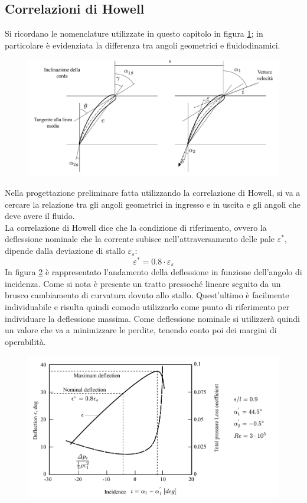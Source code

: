 \subsection{Correlazioni di Howell}
Si ricordano le nomenclature utilizzate in questo capitolo in figura \ref{fig:SchieraDim}; in particolare è evidenziata la differenza tra angoli geometrici e fluidodinamici.
\begin{figure}[h!]
	\centering
	\includegraphics[width=\textwidth]{fig/SchieraDim.pdf}
	\caption{}
	\label{fig:SchieraDim}
\end{figure}

Nella progettazione preliminare fatta utilizzando la correlazione di Howell, si va a cercare la relazione tra gli angoli geometrici in ingresso e in uscita e gli angoli che deve avere il fluido.\\
La correlazione di Howell dice che la condizione di riferimento, ovvero la deflessione nominale che la corrente subisce nell'attraversamento delle pale $\varepsilon^*$, dipende dalla deviazione di stallo $\varepsilon_s$:
\begin{equation}
\varepsilon^* = 0.8 \cdot \varepsilon_s
\end{equation}
In figura \ref{fig:Howell} è rappresentato l'andamento della deflessione in funzione dell'angolo di incidenza. Come si nota è presente un tratto pressoché lineare seguito da un brusco cambiamento di curvatura dovuto allo stallo. Quest'ultimo è facilmente individuabile e risulta quindi comodo utilizzarlo come punto di riferimento per individuare la deflessione massima. Come deflessione nominale si utilizzerà quindi un valore che va a minimizzare le perdite, tenendo conto poi dei margini di operabilità.  
\begin{figure}
\centering
  \includegraphics[width=\textwidth]{fig/Howell.pdf}
\caption{}
\label{fig:Howell}
\end{figure}

